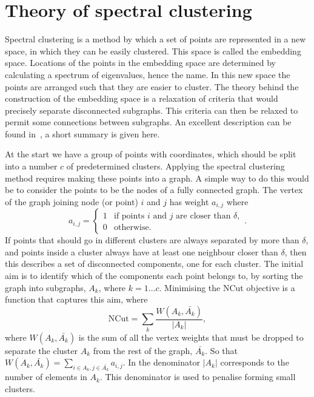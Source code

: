 \section{Theory of spectral clustering}\label{sec:spectral_theory}

Spectral clustering is a method by which a set of points are represented in a new space,
in which they can be easily clustered.
This space is called the embedding space.
Locations of the points in the embedding space are determined by calculating a
spectrum of eigenvalues, hence the name.
In this new space the points are arranged such that they are easier to cluster.
%
The theory behind the construction of the embedding space is a relaxation of criteria that would precisely
separate disconnected subgraphs.
This criteria can then be relaxed to permit some connections between subgraphs.
An excellent description can be found in~\cite{luxburg2007spectraltutorial}, a short summary is given here.

At the start we have a group of points with coordinates, which should be split into a  number \(c\) of predetermined clusters.
Applying the spectral clustering method requires making these points into a graph.
A simple way to do this would be to consider the points to be the nodes of a fully connected graph.
The vertex of the graph joining node (or point) \(i\) and \(j\) has weight \(a_{i, j}\) where
\begin{equation}
    a_{i, j}= 
    \begin{cases}
        1 & \text{if points } i \text{ and } j \text{ are closer than } \delta, \\
        0              & \text{otherwise.}
    \end{cases}
    .
\end{equation}
%
If points that should go in different clusters are always separated by more than \(\delta\),
and points inside a cluster always have at least one neighbour closer than \(\delta\),
then this describes a set of disconnected components, one for each cluster.
%
The initial aim is to identify which of the components each point belongs to,
by sorting the graph into subgraphs, \(A_k\), where \(k=1 \dots c\).
Minimising the NCut objective is a function that captures this aim, where 
\begin{equation}
    \text{NCut} = \sum_k\frac{W(A_k, \bar{A_k})}{|A_k|},
\end{equation}\label{eqn:cost_function}
where \(W(A_k, \bar{A_k})\) is the sum of all the vertex weights that must be dropped
to separate the cluster \(A_k\) from the rest of the graph, \(\bar{A_k}\).
So that \( W(A_k, \bar{A_k}) = \sum_{i \in A_k, j \in \bar{A_k}} a_{i, j} \).
In the denominator \(|A_k|\) corresponds to the number of elements in \(A_k\).
This denominator is used to penalise forming small clusters.

